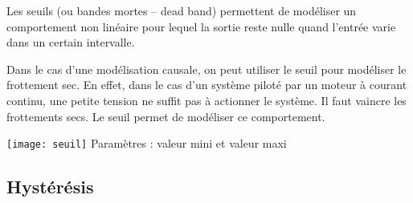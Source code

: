 \noindent \begin{minipage}[c]{.54\linewidth}
\indent Les seuils (ou bandes mortes -- dead band) permettent de modéliser un comportement non linéaire pour lequel la sortie reste nulle quand l'entrée varie dans un certain intervalle. 


Dans le cas d'une modélisation causale, on peut utiliser le seuil pour modéliser le frottement sec. En effet, dans le cas d'un système piloté par un moteur à courant continu, une petite tension ne suffit pas à actionner le système. Il faut vaincre les frottements secs. Le seuil permet de modéliser ce comportement.

\end{minipage}
\hfill
\begin{minipage}[c]{.18\linewidth}
\begin{center}
\texttt{[image: seuil]}
Paramètres : valeur mini et valeur maxi
\end{center}
\end{minipage}
\hfill
\begin{minipage}[c]{.22\linewidth}
\begin{center}
\end{center}
\end{minipage}

\subsection{Hystérésis}



